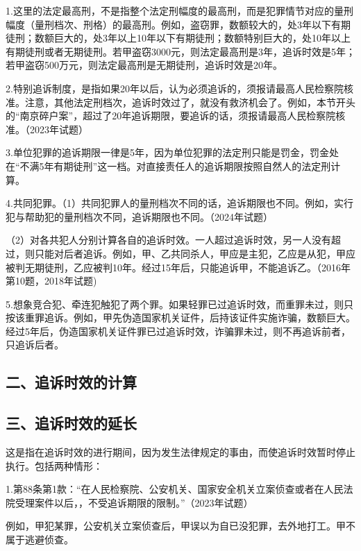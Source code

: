 1.这里的法定最高刑，不是指整个法定刑幅度的最高刑，而是犯罪情节对应的量刑幅度（量刑档次、刑格）的最高刑。例如，盗窃罪，数额较大的，处3年以下有期徒刑；数额巨大的，处3年以上10年以下有期徒刑；数额特别巨大的，处10年以上有期徒刑或者无期徒刑。若甲盗窃3000元，则法定最高刑是3年，追诉时效是5年；若甲盗窃500万元，则法定最高刑是无期徒刑，追诉时效是20年。

2.特别追诉制度，是指如果20年以后，认为必须追诉的，须报请最高人民检察院核准。注意，其他法定刑档次，追诉时效过了，就没有救济机会了。例如，本节开头的“南京碎户案”，超过了20年追诉期限，要追诉的话，须报请最高人民检察院核准。（2023年试题）

3.单位犯罪的追诉期限一律是5年，因为单位犯罪的法定刑只能是罚金，罚金处在“不满5年有期徒刑”这一档。对直接责任人的追诉期限按照自然人的法定刑计算。

4.共同犯罪。（1）共同犯罪人的量刑档次不同的话，追诉期限也不同。例如，实行犯与帮助犯的量刑档次不同，追诉期限也不同。（2024年试题）

（2）对各共犯人分别计算各自的追诉时效。一人超过追诉时效，另一人没有超过，则只能对后者追诉。例如，甲、乙共同杀人，甲应是主犯，乙应是从犯，甲应被判无期徒刑，乙应被判10年。经过15年后，只能追诉甲，不能追诉乙。（2016年第10题，2018年试题)

5.想象竞合犯、牵连犯触犯了两个罪。如果轻罪已过追诉时效，而重罪未过，则只按该重罪追诉。例如，甲先伪造国家机关证件，后持该证件实施诈骗，数额巨大。经过5年后，伪造国家机关证件罪已过追诉时效，诈骗罪未过，则不再追诉前者，只追诉后者。

\subsection*{二、追诉时效的计算}


\subsection*{三、追诉时效的延长}

这是指在追诉时效的进行期间，因为发生法律规定的事由，而使追诉时效暂时停止执行。包括两种情形：

1.第88条第1款：“在人民检察院、公安机关、国家安全机关立案侦查或者在人民法院受理案件以后，，不受追诉期限的限制。”（2023年试题）

例如，甲犯某罪，公安机关立案侦查后，甲误以为自已没犯罪，去外地打工。甲不属于逃避侦查。

